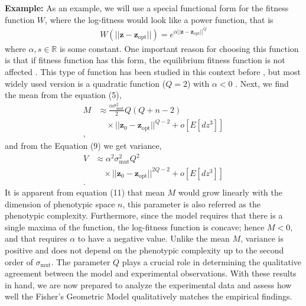 \documentclass[11pt]{article}
\begin{document}
\textbf{Example:} As an example, we will use a special functional form for the fitness function $W$, where the log-fitness would look like a power function, that is 
\begin{align*}
    W(||\mathbf{z} - \mathbf{z}_{\mathrm{opt}}||) = e^{\alpha ||\mathbf{z} - \mathbf{z}_{\mathrm{opt}}||^Q} \tag{10}
\end{align*}
where $\alpha, s \in \mathbb{R}$ is some constant. One important reason for choosing this function is that if fitness function has this form, the equilibrium fitness function is not affected \cite{sella2005application}. This type of function has been studied in this context before \cite{tenaillon2007quantifying}, but most widely used version is a quadratic function ($Q=2$) with $\alpha < 0$ \cite{lande1983measurement}. 
Next, we find the mean from the equation (5),
    \begin{align*}
        M &\approx \frac{\alpha  \sigma_{\mathrm{mut}}^2}{2} Q\left( Q + n -2  \right) \\
        & \quad \times ||\mathbf{z}_0 - \mathbf{z}_{\mathrm{opt}} ||^{Q-2} + o[E[dz^3]] \\
        , \tag{11}
    \end{align*}
    and from the Equation (9) we get variance,
    \begin{align*}
        V &\approx \alpha^2 \sigma_{\mathrm{mut}}^2 Q
        ^2 \\
        & \quad \times { ||\mathbf{z}_0 - \mathbf{z}_{\mathrm{opt}} ||^{2Q-2}}  + o[E[dz^3]]\\
        . \tag{12}
    \end{align*}
It is apparent from equation (11) that mean $M$ would grow linearly with the dimension of phenotypic space $n$, this parameter is also referred as the phenotypic complexity. Furthermore, since the model requires that there is a single maxima of the function, the log-fitness function is concave; hence $M<0$, and that requires $\alpha$ to have a negative value. Unlike the mean $M$, variance is positive and does not depend on the phenotypic complexity up to the second order of $\sigma_{\mathrm{mut}}$. The parameter $Q$ plays a crucial role in determining the qualitative agreement between the model and experimental observations. With these results in hand, we are now prepared to analyze the experimental data and assess how well the Fisher’s Geometric Model qualitatively matches the empirical findings.
    
    
     
\end{document}
